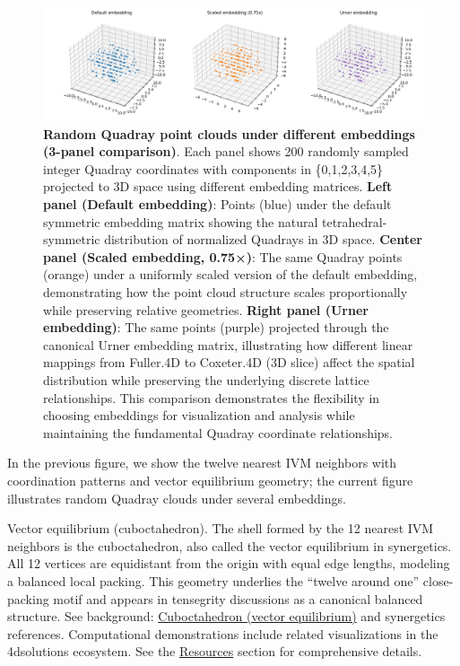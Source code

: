 \documentclass[
  10pt,
]{article}
\begin{document}
\begin{figure}
\centering
\includegraphics{../output/figures/quadray_clouds.png}
\caption{\textbf{Random Quadray point clouds under different embeddings
(3-panel comparison)}. Each panel shows 200 randomly sampled integer
Quadray coordinates with components in \{0,1,2,3,4,5\} projected to 3D
space using different embedding matrices. \textbf{Left panel (Default
embedding)}: Points (blue) under the default symmetric embedding matrix
showing the natural tetrahedral-symmetric distribution of normalized
Quadrays in 3D space. \textbf{Center panel (Scaled embedding, 0.75×)}:
The same Quadray points (orange) under a uniformly scaled version of the
default embedding, demonstrating how the point cloud structure scales
proportionally while preserving relative geometries. \textbf{Right panel
(Urner embedding)}: The same points (purple) projected through the
canonical Urner embedding matrix, illustrating how different linear
mappings from Fuller.4D to Coxeter.4D (3D slice) affect the spatial
distribution while preserving the underlying discrete lattice
relationships. This comparison demonstrates the flexibility in choosing
embeddings for visualization and analysis while maintaining the
fundamental Quadray coordinate relationships.}
\end{figure}

In the previous figure, we show the twelve nearest IVM neighbors with
coordination patterns and vector equilibrium geometry; the current
figure illustrates random Quadray clouds under several embeddings.

Vector equilibrium (cuboctahedron). The shell formed by the 12 nearest
IVM neighbors is the cuboctahedron, also called the vector equilibrium
in synergetics. All 12 vertices are equidistant from the origin with
equal edge lengths, modeling a balanced local packing. This geometry
underlies the ``twelve around one'' close-packing motif and appears in
tensegrity discussions as a canonical balanced structure. See
background:
\href{https://en.wikipedia.org/wiki/Cuboctahedron}{Cuboctahedron (vector
equilibrium)} and synergetics references. Computational demonstrations
include related visualizations in the 4dsolutions ecosystem. See the
\href{07_resources.md}{Resources} section for comprehensive details.
\end{document}

